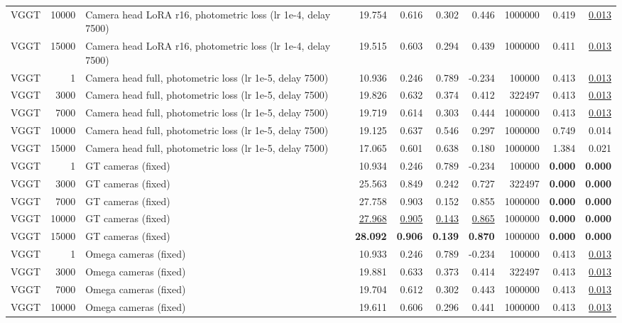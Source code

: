 \begin{table}[H]
{\begin{tabular}{lrlrrrrrrr}
VGGT & 10000 & Camera head LoRA r16, photometric loss (lr 1e-4, delay 7500) & 19.754 & 0.616 & 0.302 & 0.446 & 1000000 & 0.419 & \underline{0.013} \\
VGGT & 15000 & Camera head LoRA r16, photometric loss (lr 1e-4, delay 7500) & 19.515 & 0.603 & 0.294 & 0.439 & 1000000 & 0.411 & \underline{0.013} \\
VGGT & 1 & Camera head full, photometric loss (lr 1e-5, delay 7500) & 10.936 & 0.246 & 0.789 & -0.234 & 100000 & 0.413 & \underline{0.013} \\
VGGT & 3000 & Camera head full, photometric loss (lr 1e-5, delay 7500) & 19.826 & 0.632 & 0.374 & 0.412 & 322497 & 0.413 & \underline{0.013} \\
VGGT & 7000 & Camera head full, photometric loss (lr 1e-5, delay 7500) & 19.719 & 0.614 & 0.303 & 0.444 & 1000000 & 0.413 & \underline{0.013} \\
VGGT & 10000 & Camera head full, photometric loss (lr 1e-5, delay 7500) & 19.125 & 0.637 & 0.546 & 0.297 & 1000000 & 0.749 & 0.014 \\
VGGT & 15000 & Camera head full, photometric loss (lr 1e-5, delay 7500) & 17.065 & 0.601 & 0.638 & 0.180 & 1000000 & 1.384 & 0.021 \\
VGGT & 1 & GT cameras (fixed) & 10.934 & 0.246 & 0.789 & -0.234 & 100000 & \textbf{0.000} & \textbf{0.000} \\
VGGT & 3000 & GT cameras (fixed) & 25.563 & 0.849 & 0.242 & 0.727 & 322497 & \textbf{0.000} & \textbf{0.000} \\
VGGT & 7000 & GT cameras (fixed) & 27.758 & 0.903 & 0.152 & 0.855 & 1000000 & \textbf{0.000} & \textbf{0.000} \\
VGGT & 10000 & GT cameras (fixed) & \underline{27.968} & \underline{0.905} & \underline{0.143} & \underline{0.865} & 1000000 & \textbf{0.000} & \textbf{0.000} \\
VGGT & 15000 & GT cameras (fixed) & \textbf{28.092} & \textbf{0.906} & \textbf{0.139} & \textbf{0.870} & 1000000 & \textbf{0.000} & \textbf{0.000} \\
VGGT & 1 & Omega cameras (fixed) & 10.933 & 0.246 & 0.789 & -0.234 & 100000 & 0.413 & \underline{0.013} \\
VGGT & 3000 & Omega cameras (fixed) & 19.881 & 0.633 & 0.373 & 0.414 & 322497 & 0.413 & \underline{0.013} \\
VGGT & 7000 & Omega cameras (fixed) & 19.704 & 0.612 & 0.302 & 0.443 & 1000000 & 0.413 & \underline{0.013} \\
VGGT & 10000 & Omega cameras (fixed) & 19.611 & 0.606 & 0.296 & 0.441 & 1000000 & 0.413 & \underline{0.013} \\

\end{tabular}}
\end{table}
